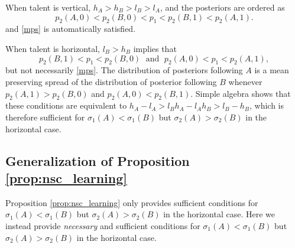 \documentclass[12pt,american]{paper}
\theoremstyle{remark}
\begin{document}
%
When talent is vertical, $h_A>h_B>l_B>l_A$, and
the posteriors are ordered as
\begin{equation*}
p_2(A,0)<p_2(B,0)<p_1<p_2(B,1)<p_2(A,1).
\end{equation*} 
and \eqref{mps} is automatically satisfied.

%
When talent is horizontal,  $l_B>h_B$ implies that 
\[  p_2(B,1)<p_1<p_2(B,0) \;\text{ and }\; p_2(A,0)<p_1<p_2(A,1), \]
but not necessarily \eqref{mps}. The distribution of posteriors following $A$ is a mean preserving spread of the distribution of posterior following $B$ whenever $p_2(A,1)>p_2(B,0)$ and $p_2(A,0)<p_2(B,1)$. Simple algebra shows that these conditions are equivalent to $h_A-l_A>l_Bh_A-l_Ah_B >l_B-h_B$, which is therefore sufficient for $\sigma_1(A)<\sigma_1(B)$ but $\sigma_2(A)>\sigma_2(B)$ in the horizontal case.
%

\subsection*{Generalization of Proposition \ref{prop:nsc_learning}}
Proposition \ref{prop:nsc_learning} only provides sufficient conditions for $\sigma_1(A)<\sigma_1(B)$ but $\sigma_2(A)>\sigma_2(B)$ in the horizontal case. Here we instead provide  \textit{necessary} and sufficient conditions for $\sigma_1(A)<\sigma_1(B)$ but $\sigma_2(A)>\sigma_2(B)$ in the horizontal case.
\end{document}

